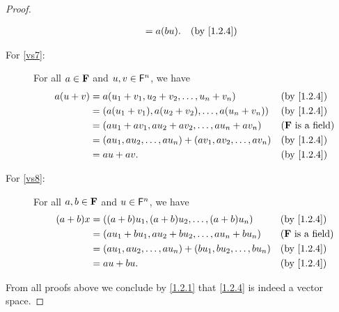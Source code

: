 \begin{proof}
\begin{description}
\begin{align*}
                         & = a \p{bu}.                                              &  & \text{(by \cref{1.2.4})}
            \end{align*}
        \item[For \ref{vs7}:]
            For all \(a \in \mathbf{F}\) and \(u, v \in \mathsf{F}^{n}\), we have
            \begin{align*}
                a \p{u + v} & = a \p{u_{1} + v_{1}, u_{2} + v_{2}, \dots, u_{n} + v_{n}}                    &  & \text{(by \cref{1.2.4})}   \\
                            & = \p{a \p{u_{1} + v_{1}}, a \p{u_{2} + v_{2}}, \dots, a \p{u_{n} + v_{n}}}    &  & \text{(by \cref{1.2.4})}   \\
                            & = \p{a u_{1} + a v_{1}, a u_{2} + a v_{2}, \dots, a u_{n} + a v_{n}}          &  & \text{(\(\F\) is a field)} \\
                            & = \p{a u_{1}, a u_{2}, \dots, a u_{n}} + \p{a v_{1}, a v_{2}, \dots, a v_{n}} &  & \text{(by \cref{1.2.4})}   \\
                            & = a u + a v.                                                                  &  & \text{(by \cref{1.2.4})}
            \end{align*}
        \item[For \ref{vs8}:]
            For all \(a, b \in \mathbf{F}\) and \(u \in \mathsf{F}^{n}\), we have
            \begin{align*}
                \p{a + b} x & = \p{\p{a + b} u_{1}, \p{a + b} u_{2}, \dots, \p{a + b} u_{n}}                &  & \text{(by \cref{1.2.4})}   \\
                            & = \p{a u_{1} + b u_{1}, a u_{2} + b u_{2}, \dots, a u_{n} + b u_{n}}          &  & \text{(\(\F\) is a field)} \\
                            & = \p{a u_{1}, a u_{2}, \dots, a u_{n}} + \p{b u_{1}, b u_{2}, \dots, b u_{n}} &  & \text{(by \cref{1.2.4})}   \\
                            & = a u + b u.                                                                  &  & \text{(by \cref{1.2.4})}
            \end{align*}
    \end{description}
    From all proofs above we conclude by \cref{1.2.1} that \cref{1.2.4} is indeed a vector space.
\end{proof}

